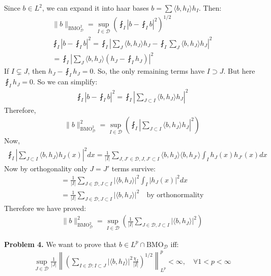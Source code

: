 \documentclass{article}
\newcommand{\D}{\mathcal{D}}
\newcommand{\bmo}{\text{BMO}}
\begin{document}
Since $b \in L^2$, we can expand it into haar bases $b = \sum \langle b, h_I \rangle h_I$. Then:
\begin{gather*}
    \lVert b \rVert_{\bmo_{\D}^2} = \sup_{I \in \D} \left( \fint_I \left|b - \fint_I b\right|^2 \right)^{1/2} \\
    \fint_I \left|b - \fint_I b\right|^2 = \fint_I \left|\sum_J \langle b, h_J \rangle h_J - \fint_I \sum_J \langle b, h_J \rangle h_J\right|^2 \\
    = \fint_I \left|\sum_J \langle b, h_J \rangle (h_J - \fint_I h_J) \right|^2
\end{gather*}
If $I \subsetneq J$, then $h_J - \fint_I h_J = 0$. So, the only remaining terms have $I \supset J$. But here $\fint_I h_J = 0$. So we can simplify:
\begin{gather*}
    \fint_I \left|b - \fint_I b\right|^2 = \fint_I \left|\sum_{J \subset I} \langle b, h_J \rangle h_J \right|^2
\end{gather*}
Therefore,
\begin{gather*}
    \lVert b \rVert_{\bmo_{\D}^2}^2 = \sup_{I \in \D} \left( \fint_I \left|\sum_{J \subset I} \langle b, h_J \rangle h_J \right|^2 \right)
\end{gather*}
Now,
\begin{gather*}
    \fint_I \left|\sum_{J \subset I} \langle b, h_J \rangle h_J(x) \right|^2 dx = \frac{1}{|I|} \sum_{J,J' \in \D, J,J' \subset I} \langle b, h_J \rangle \langle b, h_{J'} \rangle \int_I h_J(x) h_{J'}(x)dx
\end{gather*}
Now by orthogonality only $J = J'$ terms survive:
\begin{gather*}
    = \frac{1}{|I|} \sum_{J \in \D, J \subset I} | \langle b, h_J \rangle |^2 \int_I |h_J(x)|^2 dx \\
    = \frac{1}{|I|} \sum_{J \in \D, J \subset I} | \langle b, h_J \rangle |^2 \quad \text{by orthonormality}
\end{gather*}
Therefore we have proved:
\begin{gather*}
    \lVert b \rVert_{\bmo_{\D}^2}^2 = \sup_{I \in \D} \left( \frac{1}{|I|} \sum_{J \in \D, J \subset I} | \langle b, h_J \rangle |^2 \right)
\end{gather*}
\clearpage


\textbf{Problem 4. } We want to prove that $b \in L^p \cap \bmo_{\D}$ iff:
\begin{gather*}
    \sup_{J \in \D} \frac{1}{|J|} \left\lVert \left( \sum_{I \in \D: I \subset J} |\langle b, h_I \rangle|^2 \frac{\chi_I}{|I|} \right)^{1/2} \right\rVert_{L^p}^p < \infty, \quad \forall 1 < p < \infty
\end{gather*}
\end{document}
